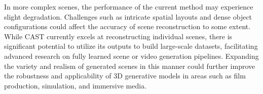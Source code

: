 In more complex scenes, the performance of the current method may experience slight degradation. Challenges such as intricate spatial layouts and dense object configurations could affect the accuracy of scene reconstruction to some extent. While CAST currently excels at reconstructing individual scenes, there is significant potential to utilize its outputs to build large-scale datasets, facilitating advanced research on fully learned scene or video generation pipelines. Expanding the variety and realism of generated scenes in this manner could further improve the robustness and applicability of 3D generative models in areas such as film production, simulation, and immersive media.
